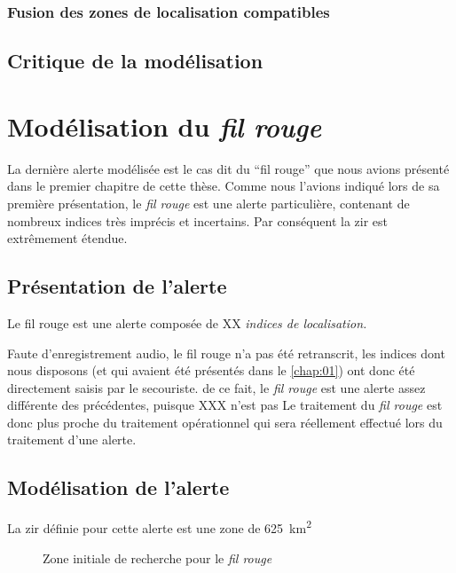 \subsubsection{Fusion des zones de localisation compatibles}
\label{subsec:9-2-2-4}

\subsection{Critique de la modélisation}
\label{subsec:9-2-3}




\section{Modélisation du \emph{fil rouge}}
\label{sec:9-3}

La dernière alerte modélisée est le cas dit du \enquote{fil rouge} que
nous avions présenté dans le premier chapitre de cette thèse. Comme
nous l'avions indiqué lors de sa première présentation, le \emph{fil
  rouge} est une alerte particulière, contenant de nombreux indices
très imprécis et incertains. Par conséquent la \ac{zir} est
extrêmement étendue.


\subsection{Présentation de l'alerte}
\label{subsec:9-3-1}

Le fil rouge est une alerte composée de XX \emph{indices de
  localisation.}


Faute d'enregistrement audio, le fil rouge n'a pas été retranscrit,
les indices dont nous disposons (et qui avaient été présentés dans le
\autoref{chap:01}) ont donc été directement saisis par le secouriste.
%
de ce fait, le \emph{fil rouge} est une alerte assez différente des
précédentes, puisque XXX n'est pas
%
Le traitement du \emph{fil rouge} est donc plus proche du traitement
opérationnel qui sera réellement effectué lors du traitement d'une
alerte.



\subsection{Modélisation de l'alerte}
\label{subsec:9-3-2}

La \ac{zir} définie pour cette alerte est une zone de
\SI{625}{\kilo\meter\squared}

\begin{figure}
  \centering
  
  \caption{Zone initiale de recherche pour le \emph{fil rouge}}
  \label{fig:zir_fil_rouge}
\end{figure}

